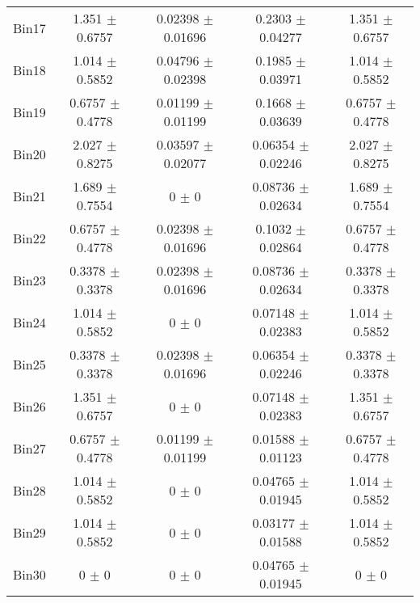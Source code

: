 \begin{tabular}{@{\extracolsep{4pt}}lcccc@{}}
     Bin17 & 1.351 $\pm$ 0.6757 & 0.02398 $\pm$ 0.01696 & 0.2303 $\pm$ 0.04277 & 1.351 $\pm$ 0.6757 \\ 
     Bin18 & 1.014 $\pm$ 0.5852 & 0.04796 $\pm$ 0.02398 & 0.1985 $\pm$ 0.03971 & 1.014 $\pm$ 0.5852 \\ 
     Bin19 & 0.6757 $\pm$ 0.4778 & 0.01199 $\pm$ 0.01199 & 0.1668 $\pm$ 0.03639 & 0.6757 $\pm$ 0.4778 \\ 
     Bin20 & 2.027 $\pm$ 0.8275 & 0.03597 $\pm$ 0.02077 & 0.06354 $\pm$ 0.02246 & 2.027 $\pm$ 0.8275 \\ 
     Bin21 & 1.689 $\pm$ 0.7554 & 0 $\pm$ 0 & 0.08736 $\pm$ 0.02634 & 1.689 $\pm$ 0.7554 \\ 
     Bin22 & 0.6757 $\pm$ 0.4778 & 0.02398 $\pm$ 0.01696 & 0.1032 $\pm$ 0.02864 & 0.6757 $\pm$ 0.4778 \\ 
     Bin23 & 0.3378 $\pm$ 0.3378 & 0.02398 $\pm$ 0.01696 & 0.08736 $\pm$ 0.02634 & 0.3378 $\pm$ 0.3378 \\ 
     Bin24 & 1.014 $\pm$ 0.5852 & 0 $\pm$ 0 & 0.07148 $\pm$ 0.02383 & 1.014 $\pm$ 0.5852 \\ 
     Bin25 & 0.3378 $\pm$ 0.3378 & 0.02398 $\pm$ 0.01696 & 0.06354 $\pm$ 0.02246 & 0.3378 $\pm$ 0.3378 \\ 
     Bin26 & 1.351 $\pm$ 0.6757 & 0 $\pm$ 0 & 0.07148 $\pm$ 0.02383 & 1.351 $\pm$ 0.6757 \\ 
     Bin27 & 0.6757 $\pm$ 0.4778 & 0.01199 $\pm$ 0.01199 & 0.01588 $\pm$ 0.01123 & 0.6757 $\pm$ 0.4778 \\ 
     Bin28 & 1.014 $\pm$ 0.5852 & 0 $\pm$ 0 & 0.04765 $\pm$ 0.01945 & 1.014 $\pm$ 0.5852 \\ 
     Bin29 & 1.014 $\pm$ 0.5852 & 0 $\pm$ 0 & 0.03177 $\pm$ 0.01588 & 1.014 $\pm$ 0.5852 \\ 
     Bin30 & 0 $\pm$ 0 & 0 $\pm$ 0 & 0.04765 $\pm$ 0.01945 & 0 $\pm$ 0 \\ 
\hline\hline
  \end{tabular}
